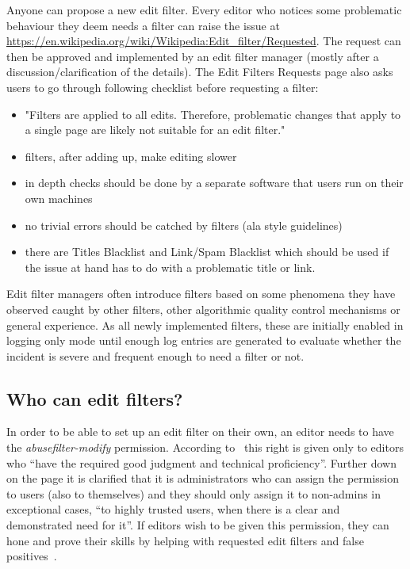 Anyone can propose a new edit filter.
Every editor who notices some problematic behaviour they deem needs a filter can raise the issue at \url{https://en.wikipedia.org/wiki/Wikipedia:Edit_filter/Requested}.
The request can then be approved and implemented by an edit filter manager (mostly after a discussion/clarification of the details).
The Edit Filters Requests page also asks users to go through following checklist before requesting a filter:
\begin{itemize}
    \item "Filters are applied to all edits. Therefore, problematic changes that apply to a single page are likely not suitable for an edit filter."
    \item filters, after adding up, make editing slower
    \item in depth checks should be done by a separate software that users run on their own machines
    \item no trivial errors should be catched by filters (ala style guidelines)
    \item there are Titles Blacklist and Link/Spam Blacklist which should be used if the issue at hand has to do with a problematic title or link.
\end{itemize}

Edit filter managers often introduce filters based on some phenomena they have observed caught by other filters, other algorithmic quality control mechanisms or general experience.
As all newly implemented filters, these are initially enabled in logging only mode until enough log entries are generated to evaluate whether the incident is severe and frequent enough to need a filter or not.


\subsection{Who can edit filters?}
\label{section:who-can-edit}

In order to be able to set up an edit filter on their own, an editor needs to have the \emph{abusefilter-modify} permission.
According to~\cite{Wikipedia:EditFilter} this right is given only to editors who ``have the required good judgment and technical proficiency''.
Further down on the page it is clarified that it is administrators who can assign the permission to users (also to themselves) and they should only assign it to non-admins in exceptional cases, ``to highly trusted users, when there is a clear and demonstrated need for it''.
If editors wish to be given this permission, they can hone and prove their skills by helping with requested edit filters and false positives~\cite{Wikipedia:EditFilter}.

